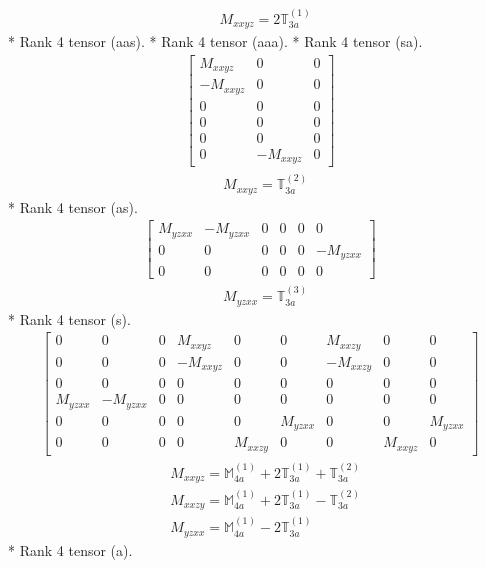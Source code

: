 \documentclass[fleqn,8pt,landscape]{jsarticle}
\begin{document}
\begin{align*}
& M_{xxyz} = 2 \mathbb{T}_{3a}^{(1)}
\end{align*}
* Rank 4 tensor (aas).
* Rank 4 tensor (aaa).
* Rank 4 tensor (sa).
\begin{align*}
\begin{bmatrix} M_{xxyz} & 0 & 0 \\ - M_{xxyz} & 0 & 0 \\ 0 & 0 & 0 \\ 0 & 0 & 0 \\ 0 & 0 & 0 \\ 0 & - M_{xxyz} & 0 \end{bmatrix}
\end{align*}
\begin{align*}
& M_{xxyz} = \mathbb{T}_{3a}^{(2)}
\end{align*}
* Rank 4 tensor (as).
\begin{align*}
\begin{bmatrix} M_{yzxx} & - M_{yzxx} & 0 & 0 & 0 & 0 \\ 0 & 0 & 0 & 0 & 0 & - M_{yzxx} \\ 0 & 0 & 0 & 0 & 0 & 0 \end{bmatrix}
\end{align*}
\begin{align*}
& M_{yzxx} = \mathbb{T}_{3a}^{(3)}
\end{align*}
* Rank 4 tensor (s).
\begin{align*}
\begin{bmatrix} 0 & 0 & 0 & M_{xxyz} & 0 & 0 & M_{xxzy} & 0 & 0 \\ 0 & 0 & 0 & - M_{xxyz} & 0 & 0 & - M_{xxzy} & 0 & 0 \\ 0 & 0 & 0 & 0 & 0 & 0 & 0 & 0 & 0 \\ M_{yzxx} & - M_{yzxx} & 0 & 0 & 0 & 0 & 0 & 0 & 0 \\ 0 & 0 & 0 & 0 & 0 & M_{yzxx} & 0 & 0 & M_{yzxx} \\ 0 & 0 & 0 & 0 & M_{xxzy} & 0 & 0 & M_{xxyz} & 0 \end{bmatrix}
\end{align*}
\begin{align*}
& M_{xxyz} = \mathbb{M}_{4a}^{(1)} + 2 \mathbb{T}_{3a}^{(1)} + \mathbb{T}_{3a}^{(2)} \\
& M_{xxzy} = \mathbb{M}_{4a}^{(1)} + 2 \mathbb{T}_{3a}^{(1)} - \mathbb{T}_{3a}^{(2)} \\
& M_{yzxx} = \mathbb{M}_{4a}^{(1)} - 2 \mathbb{T}_{3a}^{(1)}
\end{align*}
* Rank 4 tensor (a).
\end{document}
